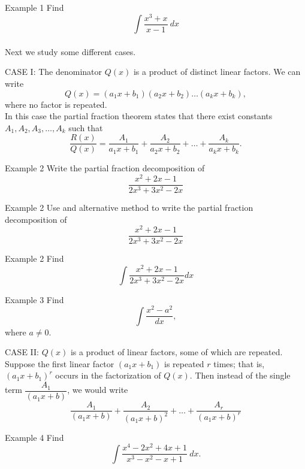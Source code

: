 \documentclass{beamer}
\begin{document}
    \begin{frame}{Example 1}
    Find \[\int \dfrac{x^3+x}{x-1}~dx\]\\ \pause
    \vspace{0.5in}
    Next we study some different cases. 
    \end{frame}

\begin{frame}{CASE I: The denominator \(Q(x)\) is a product of distinct linear factors.}    
We can write \[Q(x)=(a_1 x+b_1)(a_2x+b_2)\dots (a_k x +b_k),\] where no factor is repeated. \\ \pause
\vspace{0.2in}
In this case the partial fraction theorem states that there exist constants \(A_1,A_2,A_3, \dots , A_k\) such that \[\dfrac{R(x)}{Q(x)}= \dfrac{A_1}{a_1x+b_1}+ \dfrac{A_2}{a_2x+b_2}+ \dots + \dfrac{A_k}{a_k x +b_k}.\]
\end{frame}

\begin{frame}{Example 2}
Write the partial fraction decomposition of \[\dfrac{x^2 +2x -1}{2x^3+3x^2-2x}\]
\end{frame}

\begin{frame}{Example 2}
    Use and alternative method to write the partial fraction decomposition of \[\dfrac{x^2 +2x -1}{2x^3+3x^2-2x}\]
    \end{frame}

\begin{frame}{Example 2}
Find \[\int \dfrac{x^2 +2x -1}{2x^3+3x^2-2x}dx\]
\end{frame}

\begin{frame}{Example 3}
Find \[\int \dfrac{x^2-a^2}{dx},\] where \(a \ne 0\).
\end{frame}

\begin{frame}{CASE II: \(Q(x)\) is a product of linear factors, some of which are repeated.}
Suppose the first linear factor \((a_1 x+b_1)\) is repeated \(r\) times; that is, \((a_1 x +b_1)^r\) occurs in the factorization of \(Q(x)\). Then instead of the single term \(\dfrac{A_1}{(a_1 x+b)}\), we would write 
\[\dfrac{A_1}{(a_1 x+b)}+\dfrac{A_2}{(a_1 x+b)^2}+\dots + \dfrac{A_r}{(a_1 x+b)^r}\]
\end{frame}

\begin{frame}{Example 4}
Find \[\int \dfrac{x^4 -2x^2 +4x +1}{x^3 -x^2 -x+1}~dx.\]
\end{frame}
\end{document}
